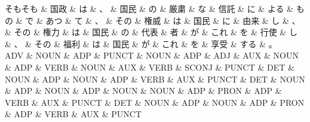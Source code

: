 \documentclass[tikz,border=5pt]{standalone}
\begin{document}
\small
\begin{dependency}[edge unit distance=8.1pt]
    \begin{deptext}[column sep=0.5em]
        そもそも \& 国政 \& は \& 、 \& 国民 \& の \& 厳粛 \& な \& 信託 \& に \& よる \& もの \& で \& あつ \& て \& 、 \& その \& 権威 \& は \& 国民 \& に \& 由来 \& し \& 、 \& その \& 権力 \& は \& 国民 \& の \& 代表 \& 者 \& が \& これ \& を \& 行使 \& し \& 、 \& その \& 福利 \& は \& 国民 \& が \& これ \& を \& 享受 \& する \& 。\\
        ADV \& NOUN \& ADP \& PUNCT \& NOUN \& ADP \& ADJ \& AUX \& NOUN \& ADP \& VERB \& NOUN \& AUX \& VERB \& SCONJ \& PUNCT \& DET \& NOUN \& ADP \& NOUN \& ADP \& VERB \& AUX \& PUNCT \& DET \& NOUN \& ADP \& NOUN \& ADP \& NOUN \& NOUN \& ADP \& PRON \& ADP \& VERB \& AUX \& PUNCT \& DET \& NOUN \& ADP \& NOUN \& ADP \& PRON \& ADP \& VERB \& AUX \& PUNCT\\
    \end{deptext}
\end{dependency}
\end{document}
